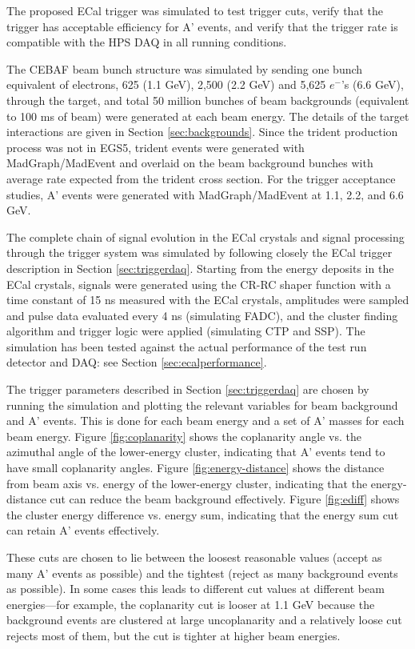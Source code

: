 The proposed ECal trigger was simulated to test trigger cuts, verify
that the trigger has acceptable efficiency for A' events, and verify 
that the trigger rate is compatible with the HPS DAQ in all running conditions. 

The CEBAF beam bunch structure was simulated by sending one bunch 
equivalent of electrons, 
625 (1.1 GeV), 2,500 (2.2 GeV) and 5,625 $e^-$'s (6.6 GeV), through 
the target, and total 50 million bunches of beam backgrounds 
(equivalent to 100 ms of beam) were 
generated at each beam energy. The details of the target interactions are given in Section \ref{sec:backgrounds}.
Since the trident production process 
was not in EGS5, trident events were generated with MadGraph/MadEvent 
and overlaid on the beam background bunches with average rate 
expected from the trident cross section.
For the trigger acceptance studies, A' events were generated with 
MadGraph/MadEvent at 1.1, 2.2, and 6.6 GeV.

The complete chain of signal evolution in the ECal crystals and 
signal processing through the trigger system was simulated
by following closely the ECal trigger description in Section \ref{sec:triggerdaq}. 
Starting from the energy deposits in the ECal crystals, signals were 
generated using the CR-RC shaper function with a time constant of 15 ns
measured with the ECal crystals, amplitudes were sampled and pulse data 
evaluated every 4 ns (simulating FADC), and the cluster 
finding algorithm and trigger logic were applied (simulating CTP and SSP). 
The simulation has been tested against the actual performance of the test run detector and DAQ: see Section \ref{sec:ecalperformance}.

The trigger parameters described in Section \ref{sec:triggerdaq} are 
chosen by running the simulation and plotting the relevant variables 
for beam background and A' events. This is done for each beam energy 
and a set of A' masses for each beam energy. 
Figure \ref{fig:coplanarity} shows the coplanarity angle vs. the azimuthal 
angle of the lower-energy cluster, indicating that A' events 
tend to have small coplanarity angles. Figure \ref{fig:energy-distance} shows
the distance from beam axis vs. energy of the lower-energy cluster,
indicating that the energy-distance cut can reduce the beam background effectively.
Figure \ref{fig:ediff} shows the cluster energy difference vs. energy sum,
indicating that the energy sum cut can retain A' events effectively.       


These cuts are chosen to lie between the loosest reasonable values (accept as many A' events as possible) and the tightest (reject as many background events as possible). In some cases this leads to different cut values at different beam energies---for example, the coplanarity cut is looser at 1.1 GeV because the background events are clustered at large uncoplanarity and a relatively loose cut rejects most of them, but the cut is tighter at higher beam energies.

